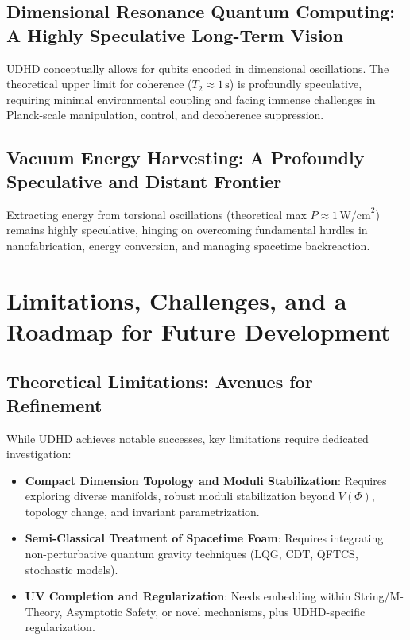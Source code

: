 \documentclass[12pt, a4paper]{article} %
\begin{document}
\subsection{Dimensional Resonance Quantum Computing: A Highly Speculative Long-Term Vision}
UDHD conceptually allows for qubits encoded in dimensional oscillations. The theoretical upper limit for coherence (\(T_2 \approx 1\,\text{s}\)) is profoundly speculative, requiring minimal environmental coupling and facing immense challenges in Planck-scale manipulation, control, and decoherence suppression.

\subsection{Vacuum Energy Harvesting: A Profoundly Speculative and Distant Frontier}
Extracting energy from torsional oscillations (theoretical max \(P \approx 1\,\text{W/cm}^2\)) remains highly speculative, hinging on overcoming fundamental hurdles in nanofabrication, energy conversion, and managing spacetime backreaction.

\section{Limitations, Challenges, and a Roadmap for Future Development}
\label{sec:limitations}

\subsection{Theoretical Limitations: Avenues for Refinement}
While UDHD achieves notable successes, key limitations require dedicated investigation:
\begin{itemize}
    \item \textbf{Compact Dimension Topology and Moduli Stabilization}: Requires exploring diverse manifolds, robust moduli stabilization beyond \(V(\Phi)\), topology change, and invariant parametrization.
    \item \textbf{Semi-Classical Treatment of Spacetime Foam}: Requires integrating non-perturbative quantum gravity techniques (LQG, CDT, QFTCS, stochastic models).
    \item \textbf{UV Completion and Regularization}: Needs embedding within String/M-Theory, Asymptotic Safety, or novel mechanisms, plus UDHD-specific regularization.
\end{itemize}
\end{document}
